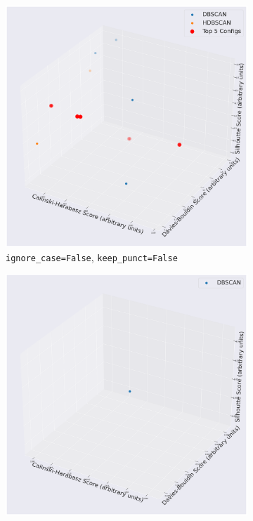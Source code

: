 \documentclass[10pt,oneside]{report}
\begin{document}
\begin{figure}[H]
    \centering
     \begin{subfigure}[b]{0.48\textwidth}
        \centering
        \includegraphics[width=\textwidth]{./images/nomic_false-false.png}
        \caption{\texttt{ignore\_case=False}, \texttt{keep\_punct=False}}
        \label{fig:nomic_ff_f4a_config} %
    \end{subfigure}
    \hfill
    \begin{subfigure}[b]{0.48\textwidth}
        \centering
        \includegraphics[width=\textwidth]{./images/nomic_true-false.png}

\end{subfigure}
\end{figure}
\end{document}
